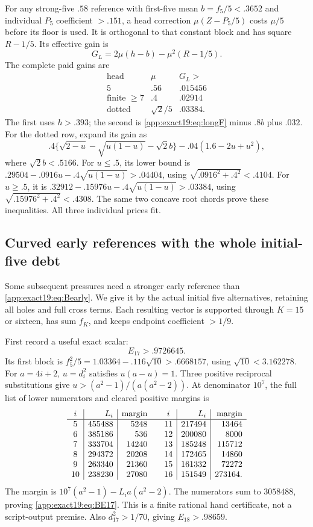 For any strong-five \(.58\)
reference with first-five mean
\(b=f_5/5<.3652\) and individual
\(P_5\) coefficient \(>.151\),
a head correction
\(\mu(Z-P_5/5)\) costs \(\mu/5\)
before its floor is used.
It is orthogonal to that constant
block and has square \(R-1/5\).
Its effective gain is
\[
                             G_L=2\mu(h-b)-\mu^2(R-1/5).
\]
The complete paid gains are
\[
\begin{array}{c|c|c}
 \text{head}&\mu&G_L>\\ \hline
 5&.56&.015456\\
 \text{finite }\ge7&.4&.02914\\
 \text{dotted}&\sqrt2/5&.03384 .
\end{array}
\tag{B19headgains}\label{app:exact19:eq:Bheadgains}
\]
The first uses \(h>.393\);
the second is
\eqref{app:exact19:eq:longF}
minus \(.8b\) plus \(.032\).
For the dotted row, expand its
gain as
\[
 .4\{\sqrt{2-u}-\sqrt{u(1-u)}-\sqrt2b\}
                                -.04(1.6-2u+u^2),
\]
where \(\sqrt2b<.5166\).
For \(u\le.5\), its lower bound is
\(.29504-.0916u-.4\sqrt{u(1-u)}>.04404\),
using \(\sqrt{.0916^2+.4^2}<.4104\).
For \(u\ge.5\), it is
\(.32912-.15976u-.4\sqrt{u(1-u)}>.03384\),
using \(\sqrt{.15976^2+.4^2}<.4308\).
The same two concave root chords
prove these inequalities.
All three individual prices fit.

\subsection{Curved early references with the whole initial-five debt}
\label{app:exact19:Bcurvedearly}

Some subsequent pressures need a
stronger early reference than
\eqref{app:exact19:eq:Bearly}.
We give it by the actual initial
five alternatives, retaining all
holes and full cross terms.
Each resulting vector is supported
through \(K=15\) or sixteen,
has sum \(f_K\), and keeps endpoint
coefficient \(>1/9\).

First record a useful exact scalar:
\[
                              E_{17}>.9726645 .
\tag{B19E17}\label{app:exact19:eq:BE17}
\]
Its first block is
\(f_5^2/5=1.03364-.116\sqrt{10}>.6668157\),
using \(\sqrt{10}<3.162278\).
For \(a=4i+2\),
\(u=d_i^2\) satisfies \(u(a-u)=1\).
Three positive reciprocal
substitutions give
\(u>(a^2-1)/(a(a^2-2))\).
At denominator \(10^7\), the full
list of lower numerators and
cleared positive margins is
\[
\begin{array}{c|r|r@{\qquad}c|r|r}
 i&L_i&\text{margin}&i&L_i&\text{margin}\\ \hline
5&455488&5248&11&217494&13464\\
6&385186&536&12&200080&8000\\
7&333704&14240&13&185248&115712\\
8&294372&20208&14&172465&14860\\
9&263340&21360&15&161332&72272\\
10&238230&27080&16&151549&273164 .
\end{array}
\]
The margin is
\(10^7(a^2-1)-L_i a(a^2-2)\).
The numerators sum to \(3058488\),
proving \eqref{app:exact19:eq:BE17}.
This is a finite rational hand
certificate, not a script-output
premise.
Also \(d_{17}^2>1/70\), giving
\(E_{18}>.98659\).

